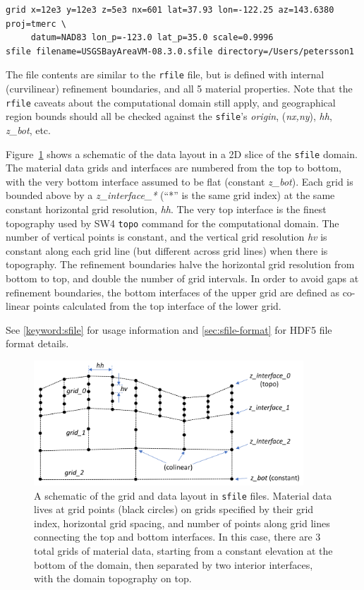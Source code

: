 \documentclass[11pt]{report}
\begin{document}
\begin{verbatim}
grid x=12e3 y=12e3 z=5e3 nx=601 lat=37.93 lon=-122.25 az=143.6380 proj=tmerc \
     datum=NAD83 lon_p=-123.0 lat_p=35.0 scale=0.9996
sfile filename=USGSBayAreaVM-08.3.0.sfile directory=/Users/petersson1
\end{verbatim}

The file contents are similar to the \verb+rfile+ file, but is
  defined with internal (curvilinear) refinement boundaries,
  and all 5 material properties.
Note that the \verb+rfile+ caveats about the computational domain
  still apply, and geographical region bounds should all be
  checked against the \verb+sfile+'s {\em origin}, 
  ({\em nx,ny}), {\em hh}, {\em z\_bot}, etc.

Figure~\ref{fig:sfile} shows a schematic of the data layout in a 2D slice
  of the \verb+sfile+ domain.
The material data grids and interfaces are numbered from the top to bottom,
  with the very bottom interface assumed to be flat (constant {\em z\_bot}).
Each grid is bounded above by a {\em z\_interface\_*} (``*'' is the same 
  grid index) at the same constant horizontal grid resolution, {\em hh}.
The very top interface is the finest topography used by SW4 
  \verb+topo+ command for the computational domain.
The number of vertical points is constant, and the vertical grid resolution
  {\em hv} is constant along each grid line (but different across grid lines)
  when there is topography.
The refinement boundaries halve the horizontal grid resolution from bottom
  to top, and double the number of grid intervals.
In order to avoid gaps at refinement boundaries, the bottom interfaces
  of the upper grid are defined as co-linear points calculated from the top
  interface of the lower grid.

See \ref{keyword:sfile} for usage information and \ref{sec:sfile-format}
  for HDF5 file format details.

\begin{figure}[htbp]
\begin{center}
\includegraphics[width=0.9\textwidth]{figures/sfile.png}
  \caption{A schematic of the grid and data layout in {\tt sfile} files.
  Material data lives at grid points (black circles) on grids specified
  by their grid index, horizontal grid spacing, and number of points
  along grid lines connecting the top and bottom interfaces.
  In this case, there are 3 total grids of material data, starting
  from a constant elevation at the bottom of the domain, then separated by
  two interior interfaces, with the domain topography on top.
  }
\label{fig:sfile}
\end{center}
\end{figure}
\end{document}
